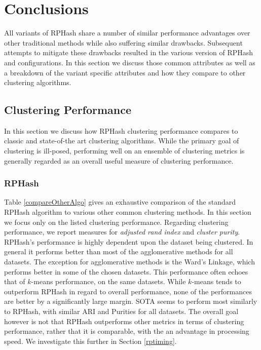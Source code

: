 
\chapter{Conclusions}\label{conclusions}

All variants of \textsf{RPHash} share a number of similar performance advantages over other traditional
methods while also suffering similar drawbacks.  Subsequent attempts to mitigate these drawbacks
resulted in the various version of \textsf{RPHash} and configurations.  In this section we discuss those
common attributes as well as a breakdown of the variant specific attributes and how they compare to
other clustering algorithms.

\section{Clustering Performance}

In this section we discuss how \textsf{RPHash} clustering performance compares to classic and state-of-the art
clustering algorithms.  While the primary goal of clustering is ill-posed, performing well on an
ensemble of clustering metrics is generally regarded as an overall useful measure of clustering
performance.

\subsection{RPHash}

Table \ref{compareOtherAlgo} gives an exhaustive comparison of the standard \textsf{RPHash} algorithm to
various other common clustering methods.  In this section we focus only on the listed clustering
performance.  Regarding clustering performance, we report measures for \emph{adjusted rand index}
and \emph{cluster purity}.  \textsf{RPHash}'s performance is highly dependent upon the dataset being
clustered.  In general it performs better than most of the agglomerative methods for all datasets.
The exception for agglomerative methods is the Ward's Linkage, which performs better in some of the
chosen datasets.  This performance often echoes that of $k$-means performance, on the same
datasets.  While $k$-means tends to outperform \textsf{RPHash} in regard to overall performance, none of the
performances are better by a significantly large margin.  SOTA seems to perform most similarly to
\textsf{RPHash}, with similar ARI and Purities for all datasets.  The overall goal however is not that \textsf{RPHash}
outperforms other metrics in terms of clustering performance, rather that it is comparable, with the
an advantage in processing speed.  We investigate this further in Section \ref{rptiming}.

